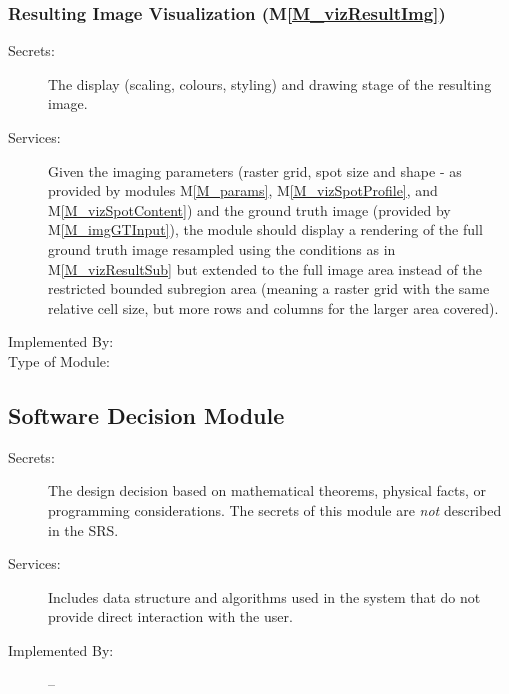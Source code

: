 \documentclass[12pt, titlepage]{article}
\newcommand{\mref}[1]{M\ref{#1}}
\begin{document}
\subsubsection{Resulting Image Visualization (\mref{M_vizResultImg})}
\begin{description}
\item[Secrets:]The display (scaling, colours, styling) and drawing stage 
  of the resulting image.
\item[Services:]Given the imaging parameters (raster grid, spot size and shape -
  as provided by modules \mref{M_params}, \mref{M_vizSpotProfile}, and \mref{M_vizSpotContent})
  and the ground truth image (provided by \mref{M_imgGTInput}),
  the module should display a rendering of the full ground truth image resampled
  using the conditions as in \mref{M_vizResultSub} but extended to the full image area
  instead of the restricted bounded subregion area (meaning a raster grid with the same
  relative cell size, but more rows and columns for the larger area covered).
\item[Implemented By:] \progname{}
\item[Type of Module:] 
\end{description}



\subsection{Software Decision Module}

\begin{description}
\item[Secrets:] The design decision based on mathematical theorems, physical
  facts, or programming considerations. The secrets of this module are
  \emph{not} described in the SRS.
\item[Services:] Includes data structure and algorithms used in the system that
  do not provide direct interaction with the user. 
\item[Implemented By:] --
\end{description}
\end{document}
